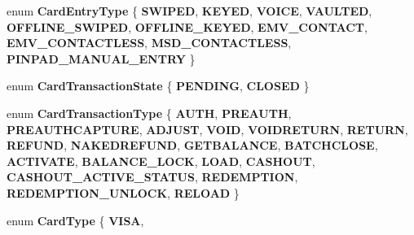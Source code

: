 \begin{DoxyCompactItemize}
enum {\bfseries Card\+Entry\+Type} \{ \newline
{\bfseries S\+W\+I\+P\+ED}, 
{\bfseries K\+E\+Y\+ED}, 
{\bfseries V\+O\+I\+CE}, 
{\bfseries V\+A\+U\+L\+T\+ED}, 
\newline
{\bfseries O\+F\+F\+L\+I\+N\+E\+\_\+\+S\+W\+I\+P\+ED}, 
{\bfseries O\+F\+F\+L\+I\+N\+E\+\_\+\+K\+E\+Y\+ED}, 
{\bfseries E\+M\+V\+\_\+\+C\+O\+N\+T\+A\+CT}, 
{\bfseries E\+M\+V\+\_\+\+C\+O\+N\+T\+A\+C\+T\+L\+E\+SS}, 
\newline
{\bfseries M\+S\+D\+\_\+\+C\+O\+N\+T\+A\+C\+T\+L\+E\+SS}, 
{\bfseries P\+I\+N\+P\+A\+D\+\_\+\+M\+A\+N\+U\+A\+L\+\_\+\+E\+N\+T\+RY}
 \}
\item 
\mbox{\label{namespacecom_1_1clover_1_1sdk_1_1v3_1_1payments_a6f15251c00491e4f9504fe59560bcf4b}} 
enum {\bfseries Card\+Transaction\+State} \{ {\bfseries P\+E\+N\+D\+I\+NG}, 
{\bfseries C\+L\+O\+S\+ED}
 \}
\item 
\mbox{\label{namespacecom_1_1clover_1_1sdk_1_1v3_1_1payments_a4207f1c1388f6f392bd998855cc88936}} 
enum {\bfseries Card\+Transaction\+Type} \{ \newline
{\bfseries A\+U\+TH}, 
{\bfseries P\+R\+E\+A\+U\+TH}, 
{\bfseries P\+R\+E\+A\+U\+T\+H\+C\+A\+P\+T\+U\+RE}, 
{\bfseries A\+D\+J\+U\+ST}, 
\newline
{\bfseries V\+O\+ID}, 
{\bfseries V\+O\+I\+D\+R\+E\+T\+U\+RN}, 
{\bfseries R\+E\+T\+U\+RN}, 
{\bfseries R\+E\+F\+U\+ND}, 
\newline
{\bfseries N\+A\+K\+E\+D\+R\+E\+F\+U\+ND}, 
{\bfseries G\+E\+T\+B\+A\+L\+A\+N\+CE}, 
{\bfseries B\+A\+T\+C\+H\+C\+L\+O\+SE}, 
{\bfseries A\+C\+T\+I\+V\+A\+TE}, 
\newline
{\bfseries B\+A\+L\+A\+N\+C\+E\+\_\+\+L\+O\+CK}, 
{\bfseries L\+O\+AD}, 
{\bfseries C\+A\+S\+H\+O\+UT}, 
{\bfseries C\+A\+S\+H\+O\+U\+T\+\_\+\+A\+C\+T\+I\+V\+E\+\_\+\+S\+T\+A\+T\+US}, 
\newline
{\bfseries R\+E\+D\+E\+M\+P\+T\+I\+ON}, 
{\bfseries R\+E\+D\+E\+M\+P\+T\+I\+O\+N\+\_\+\+U\+N\+L\+O\+CK}, 
{\bfseries R\+E\+L\+O\+AD}
 \}
\item 
\mbox{\label{namespacecom_1_1clover_1_1sdk_1_1v3_1_1payments_ae544d2f27295fd15a3abb7d87bc35928}} 
enum {\bfseries Card\+Type} \{ \newline
{\bfseries V\+I\+SA}, 

\end{DoxyCompactItemize}
